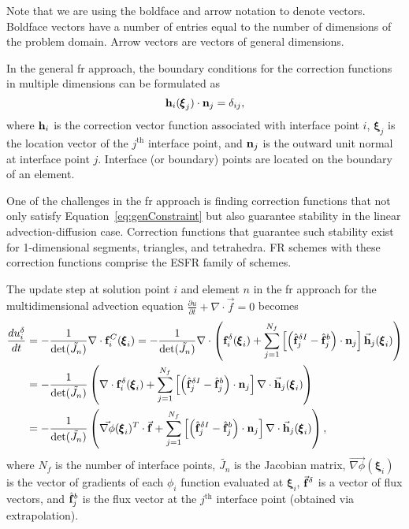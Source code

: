 Note that we are using the boldface and arrow notation to denote vectors. Boldface vectors have a number of entries equal to the number of dimensions of the problem domain. Arrow vectors are vectors of general dimensions.

In the general \gls{fr} approach, the boundary conditions for the correction functions in multiple dimensions can be formulated as
\begin{equation}\label{eq:genConstraint}
{\bf{h}}_i( {\pmb \xi}_j)\cdot {\bf{n}}_j = \delta_{ij},
\end{equation}
where ${\bf{h}}_i$ is the correction vector function associated with interface point $i$, ${\pmb \xi}_j$ is the location vector of the $j^\text{th}$ interface point, and ${\bf{n}}_j$ is the outward unit normal at interface point $j$. Interface (or boundary) points are located on the boundary of an element.

One of the challenges in the \gls{fr} approach is finding correction functions that not only satisfy Equation~\eqref{eq:genConstraint} but also guarantee stability in the linear advection-diffusion case. Correction functions that guarantee such stability exist for 1-dimensional segments\cite{vincent2011new}, triangles\cite{castonguay2012new,williams2013tri}, and tetrahedra\cite{williams2013tet}. FR schemes with these correction functions comprise the ESFR family of schemes.

The update step at solution point $i$ and element $n$ in the \gls{fr} approach for the multidimensional advection equation $\frac{\partial u}{\partial t} + \nabla \cdot \vec{f} = 0$ becomes
\begin{equation}
\label{eqn:discrete}
\begin{split}
\frac{d {u}^\delta_i}{d t} &= - \frac{1}{\text{det}(\tilde{J_n})} \nabla \cdot {\bf f}_i^C({\pmb \xi}_i) = - \frac{1}{\text{det}(\tilde{J_n})} \nabla \cdot \left({\bf f}_i^\delta({\pmb \xi}_i) + \sum^{N_f}_{j = 1} \left[\left( \hat{\bf f}^{\delta I}_j - \hat{\bf f}^b_j \right)\cdot {\bf n}_j \right]\vec{\bf h}_j ({\pmb \xi}_i) \right)\\
&=- \frac{1}{\text{det}(\tilde{J_n})} \left( \nabla \cdot {\bf f}_i^\delta({\pmb \xi}_i) + \sum^{N_f}_{j = 1} \left[\left( \hat{\bf f}^{\delta I}_j - \hat{\bf f}^b_j\right)\cdot {\bf n}_j \right]\nabla \cdot\vec{\bf h}_j ({\pmb \xi}_i)\right)\\
&=- \frac{1}{\text{det}(\tilde{J_n})} \left( \vec{\nabla \phi}({\pmb \xi}_i)^T  \cdot  \vec{\bf f} + \sum^{N_f}_{j = 1} \left[\left( \hat{\bf f}^{\delta I}_j - \hat{\bf f}^b_j\right)\cdot {\bf n}_j \right]\nabla \cdot\vec{\bf h}_j ({\pmb \xi}_i)\right),\\
\end{split}
\end{equation}
where $N_f$ is the number of interface points, $\tilde{J_n}$ is the Jacobian matrix, $\vec{\nabla \phi}({\pmb \xi}_i)$ is the vector of gradients of each $\phi_i$ function evaluated at ${\pmb \xi}_i$, $\vec{\bf f}^\delta$ is a vector of flux vectors, and $\hat{\bf f}^b_j$ is the flux vector at the $j^{\text{th}}$ interface point (obtained via extrapolation).

